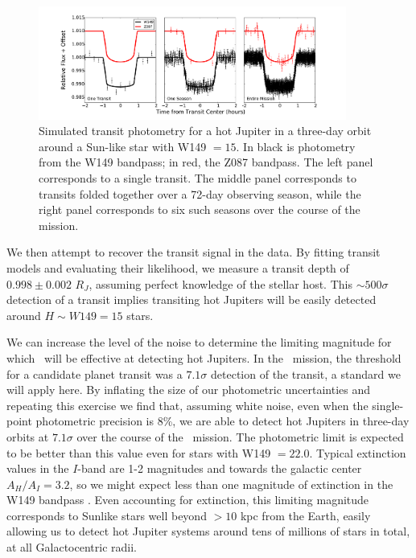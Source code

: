 \begin{figure}[htbp!]
\centerline{\includegraphics[width=0.9\textwidth]{chapter8/f2.pdf}}
\caption[Simulated transit photometry for a hot Jupiter in a three-day orbit
around a Sun-like star as observed with \WF.]{Simulated transit photometry for a hot Jupiter in a three-day orbit
around a Sun-like star with W149 $= 15$. In black is photometry from the
W149 bandpass; in red, the Z087 bandpass. The left panel corresponds to a single
transit. The middle panel corresponds to transits folded together over a 72-day
observing season, while the right panel corresponds to six such seasons over the
course of the mission.}
\label{fig:HJtrans}
\end{figure}

We then attempt to recover the transit signal in the data. By fitting transit
models and evaluating their likelihood, we measure a transit depth of
$0.998 \pm 0.002$ $R_J$, assuming perfect knowledge of the stellar host. 
This $\sim 500 \sigma$ detection of a transit implies
transiting hot Jupiters will be easily detected around $H \sim W149 = 15$ stars.

We can increase the level of the noise to determine the limiting magnitude
for which \WF\ will be effective at detecting hot Jupiters.
In the \kep\ mission, the threshold for a candidate planet transit was a $7.1\sigma$
detection of the transit, a standard we will apply here.
By inflating the size of our photometric uncertainties and repeating this exercise
we find that, assuming white noise, even when the single-point photometric precision
is 8\%, we are able to detect hot Jupiters in three-day orbits at $7.1 \sigma$ over
the course of the \WF\ mission.
The photometric limit is expected to be better than this value even
for stars with W149 $= 22.0$.
Typical extinction values in the $I$-band are 1-2 magnitudes \citep{Nataf13} and towards the 
galactic center $A_H/A_I = 3.2$, so we might expect less than one magnitude of
extinction in the W149 bandpass \citep{Nishiyama09, Nataf16}.
Even accounting for extinction, this limiting magnitude corresponds to Sunlike
stars well beyond $> 10$ kpc from the Earth, easily allowing us to detect hot Jupiter
systems around tens of millions of stars in total, at all Galactocentric radii.

